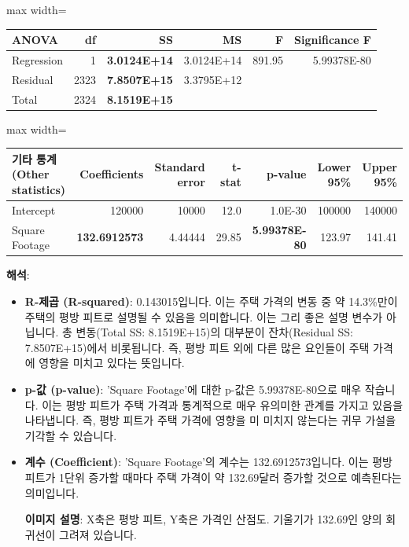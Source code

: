 \documentclass[11pt,a4paper]{article}
\theoremstyle{definition}
\begin{document}
\begin{tcolorbox}[examplebox, title=Excel 실습: Zillow 주택 데이터]
\begin{adjustbox}{max width=\textwidth}
\begin{tabular}{lrrrrr}
\toprule
\textbf{ANOVA} & \textbf{df} & \textbf{SS} & \textbf{MS} & \textbf{F} & \textbf{Significance F} \\
\midrule
Regression & 1 & \textbf{3.0124E+14} & 3.0124E+14 & 891.95 & 5.99378E-80 \\
Residual & 2323 & \textbf{7.8507E+15} & 3.3795E+12 & & \\
Total & 2324 & \textbf{8.1519E+15} & & & \\
\bottomrule
\end{tabular}
\end{adjustbox}

\begin{adjustbox}{max width=\textwidth}
\begin{tabular}{lrrrrrr}
\toprule
\textbf{기타 통계 (Other statistics)} & \textbf{Coefficients} & \textbf{Standard error} & \textbf{t-stat} & \textbf{p-value} & \textbf{Lower 95\%} & \textbf{Upper 95\%} \\
\midrule
Intercept & 120000 & 10000 & 12.0 & 1.0E-30 & 100000 & 140000 \\
Square Footage & \textbf{132.6912573} & 4.44444 & 29.85 & \textbf{5.99378E-80} & 123.97 & 141.41 \\
\bottomrule
\end{tabular}
\end{adjustbox}

\textbf{해석}:
\begin{itemize}
    \item \textbf{R-제곱 (R-squared)}: 0.143015입니다. 이는 주택 가격의 변동 중 약 14.3\%만이 주택의 평방 피트로 설명될 수 있음을 의미합니다. 이는 그리 좋은 설명 변수가 아닙니다. 총 변동(Total SS: 8.1519E+15)의 대부분이 잔차(Residual SS: 7.8507E+15)에서 비롯됩니다. 즉, 평방 피트 외에 다른 많은 요인들이 주택 가격에 영향을 미치고 있다는 뜻입니다.

    \item \textbf{p-값 (p-value)}: 'Square Footage'에 대한 p-값은 5.99378E-80으로 매우 작습니다. 이는 평방 피트가 주택 가격과 통계적으로 매우 유의미한 관계를 가지고 있음을 나타냅니다. 즉, 평방 피트가 주택 가격에 영향을 미 미치지 않는다는 귀무 가설을 기각할 수 있습니다.

    \item \textbf{계수 (Coefficient)}: 'Square Footage'의 계수는 132.6912573입니다. 이는 평방 피트가 1단위 증가할 때마다 주택 가격이 약 132.69달러 증가할 것으로 예측된다는 의미입니다.
    \begin{center}
    \end{center}
    \textbf{이미지 설명}: X축은 평방 피트, Y축은 가격인 산점도. 기울기가 132.69인 양의 회귀선이 그려져 있습니다.


\end{itemize}
\end{tcolorbox}
\end{document}
